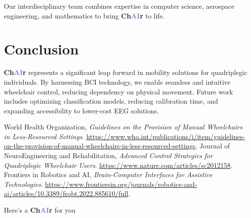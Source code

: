 \documentclass[a4paper]{article}
\newcommand\chair{\textbf{Ch\textcolor[HTML]{6B8ACD}{AI}r}\xspace}
\begin{document}
Our interdisciplinary team combines expertise in computer science,
aerospace engineering, and mathematics to bring \chair to life.

\section{Conclusion}

\chair represents a significant leap forward in mobility solutions
for quadriplegic individuals. By harnessing BCI technology,
we enable seamless and intuitive wheelchair control, reducing dependency
on physical movement. Future work includes optimizing classification models,
reducing calibration time, and expanding accessibility to
lower-cost EEG solutions.

\begin{thebibliography}{9}
 World Health Organization, \textit{Guidelines on the Provision of Manual Wheelchairs in Less-Resourced Settings}. \url{https://www.who.int/publications/i/item/guidelines-on-the-provision-of-manual-wheelchairs-in-less-resourced-settings}.
 Journal of NeuroEngineering and Rehabilitation, \textit{Advanced Control Strategies for Quadriplegic Wheelchair Users}. \url{https://www.nature.com/articles/sc2012158}.
 Frontiers in Robotics and AI, \textit{Brain-Computer Interfaces for Assistive Technologies}. \url{https://www.frontiersin.org/journals/robotics-and-ai/articles/10.3389/frobt.2022.885610/full}.
\end{thebibliography}

Here's a \chair for you
\end{document}
